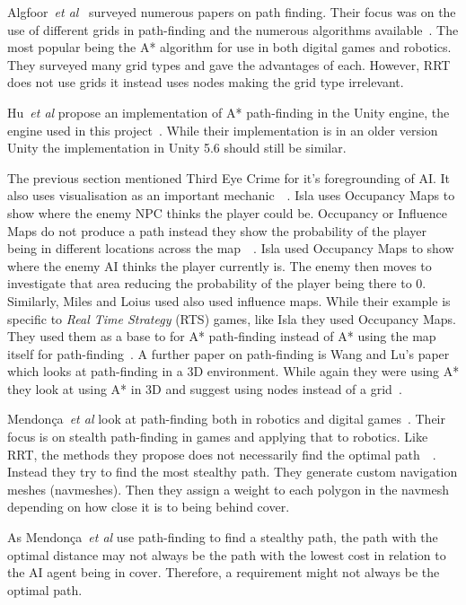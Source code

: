 \documentclass[journal]{IEEEtran}
\begin{document}
Algfoor~\textit{et al}~\cite{Algfoor2015} surveyed numerous papers on path finding. Their focus was on the use of different grids in path-finding and the numerous algorithms available~\cite{Algfoor2015}. The most popular being the A* algorithm for use in both digital games and robotics. They surveyed many grid types and gave the advantages of each. However, RRT does not use grids it instead uses nodes making the grid type irrelevant.

Hu~\textit{et al} propose an implementation of A* path-finding in the Unity engine, the engine used in this project~\cite{Hu2012}.  While their implementation is in an older version Unity the implementation in Unity 5.6 should still be similar. 

The previous section mentioned Third Eye Crime for it's foregrounding of AI.  It also uses visualisation as an important mechanic~\cite{Isla2014}~\cite{game:ThirdEyeCrime}.  Isla uses Occupancy Maps to show where the enemy NPC thinks the player could be. Occupancy or Influence Maps do not produce a path instead they show the probability of the player being in different locations across the map~\cite{Isla2014}~\cite{Miles2006}. Isla used Occupancy Maps to show where the enemy AI thinks the player currently is. The enemy then moves to investigate that area reducing the probability of the player being there to 0.  Similarly, Miles and Loius used also used influence maps. While their example is specific to \textit{Real Time Strategy} (RTS) games, like Isla they used Occupancy Maps.  They used them as a base to for A* path-finding instead of A* using the map itself for path-finding~\cite{Miles2006}.
A further paper on path-finding is Wang and Lu's paper which looks at path-finding in a 3D environment. While again they were using A* they look at using A* in 3D and suggest using nodes instead of a grid~\cite{wang2012}.

Mendonça~\textit{et al} look at path-finding both in robotics and digital games~\cite{Mendonça2015}. Their focus is on stealth path-finding in games and applying that to robotics. Like RRT, the methods they propose does not necessarily find the optimal path~\cite{karaman2010}~\cite{Mendonça2015}. Instead they try to find the most stealthy path. They generate custom navigation meshes (navmeshes). Then they assign a weight to each polygon in the navmesh depending on how close it is to being behind cover. 

As Mendonça~\textit{et al} use path-finding to find a stealthy path, the path with the optimal distance may not always be the path with the lowest cost in relation to the AI agent being in cover. Therefore, a requirement might not always be the optimal path. 
\end{document}
